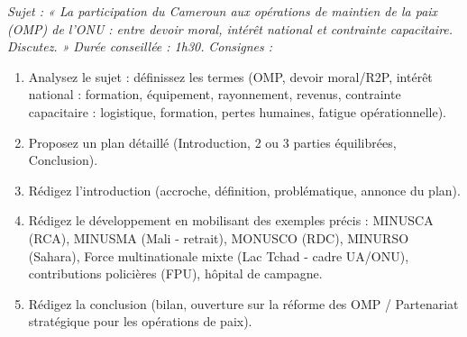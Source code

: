 \documentclass[11pt]{article}
\begin{document}
\begin{exercice}
\emph{Sujet : « La participation du Cameroun aux opérations de maintien de la paix (OMP) de l'ONU : entre devoir moral, intérêt national et contrainte capacitaire. Discutez. »}
\emph{Durée conseillée : 1h30.}
\emph{Consignes :}
\begin{enumerate}
    \item Analysez le sujet : définissez les termes (OMP, devoir moral/R2P, intérêt national : formation, équipement, rayonnement, revenus, contrainte capacitaire : logistique, formation, pertes humaines, fatigue opérationnelle).
    \item Proposez un plan détaillé (Introduction, 2 ou 3 parties équilibrées, Conclusion).
    \item Rédigez l'introduction (accroche, définition, problématique, annonce du plan).
    \item Rédigez le développement en mobilisant des exemples précis : MINUSCA (RCA), MINUSMA (Mali - retrait), MONUSCO (RDC), MINURSO (Sahara), Force multinationale mixte (Lac Tchad - cadre UA/ONU), contributions policières (FPU), hôpital de campagne.
    \item Rédigez la conclusion (bilan, ouverture sur la réforme des OMP / Partenariat stratégique pour les opérations de paix).
\end{enumerate}
\end{exercice}
\end{document}
